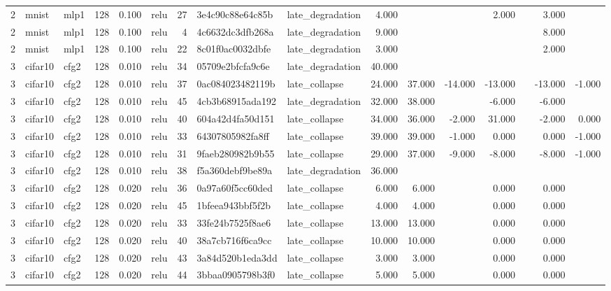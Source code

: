 \begin{table}[htbp]
{\begin{tabular}{@{}rllrrlrllrrrrrrr@{}}
2 & mnist & mlp1 & 128 & 0.100 & relu & 27 & 3e4c90c88e64c85b & late\_degradation & 4.000 &  &  & 2.000 &  & 3.000 &  \\
2 & mnist & mlp1 & 128 & 0.100 & relu & 4 & 4c6632dc3dfb268a & late\_degradation & 9.000 &  &  &  &  & 8.000 &  \\
2 & mnist & mlp1 & 128 & 0.100 & relu & 22 & 8c01f0ac0032dbfe & late\_degradation & 3.000 &  &  &  &  & 2.000 &  \\
3 & cifar10 & cfg2 & 128 & 0.010 & relu & 34 & 05709e2bfcfa9c6e & late\_degradation & 40.000 &  &  &  &  &  &  \\
3 & cifar10 & cfg2 & 128 & 0.010 & relu & 37 & 0ac084023482119b & late\_collapse & 24.000 & 37.000 & -14.000 & -13.000 &  & -13.000 & -1.000 \\
3 & cifar10 & cfg2 & 128 & 0.010 & relu & 45 & 4cb3b68915ada192 & late\_degradation & 32.000 & 38.000 &  & -6.000 &  & -6.000 &  \\
3 & cifar10 & cfg2 & 128 & 0.010 & relu & 40 & 604a42d4fa50d151 & late\_collapse & 34.000 & 36.000 & -2.000 & 31.000 &  & -2.000 & 0.000 \\
3 & cifar10 & cfg2 & 128 & 0.010 & relu & 33 & 64307805982fa8ff & late\_collapse & 39.000 & 39.000 & -1.000 & 0.000 &  & 0.000 & -1.000 \\
3 & cifar10 & cfg2 & 128 & 0.010 & relu & 31 & 9faeb280982b9b55 & late\_collapse & 29.000 & 37.000 & -9.000 & -8.000 &  & -8.000 & -1.000 \\
3 & cifar10 & cfg2 & 128 & 0.010 & relu & 38 & f5a360debf9be89a & late\_degradation & 36.000 &  &  &  &  &  &  \\
3 & cifar10 & cfg2 & 128 & 0.020 & relu & 36 & 0a97a60f5cc60ded & late\_collapse & 6.000 & 6.000 &  & 0.000 &  & 0.000 &  \\
3 & cifar10 & cfg2 & 128 & 0.020 & relu & 45 & 1bfeea943bbf5f2b & late\_collapse & 4.000 & 4.000 &  & 0.000 &  & 0.000 &  \\
3 & cifar10 & cfg2 & 128 & 0.020 & relu & 33 & 33fe24b7525f8ae6 & late\_collapse & 13.000 & 13.000 &  & 0.000 &  & 0.000 &  \\
3 & cifar10 & cfg2 & 128 & 0.020 & relu & 40 & 38a7cb716f6ca9cc & late\_collapse & 10.000 & 10.000 &  & 0.000 &  & 0.000 &  \\
3 & cifar10 & cfg2 & 128 & 0.020 & relu & 43 & 3a84d520b1eda3dd & late\_collapse & 3.000 & 3.000 &  & 0.000 &  & 0.000 &  \\
3 & cifar10 & cfg2 & 128 & 0.020 & relu & 44 & 3bbaa0905798b3f0 & late\_collapse & 5.000 & 5.000 &  & 0.000 &  & 0.000 &  \\

\end{tabular}}
\end{table}
